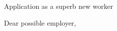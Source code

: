 
\opening{		
	\large{Application as a superb new worker} \normalsize 
}


\makelettertitle\justifying
Dear possible employer,